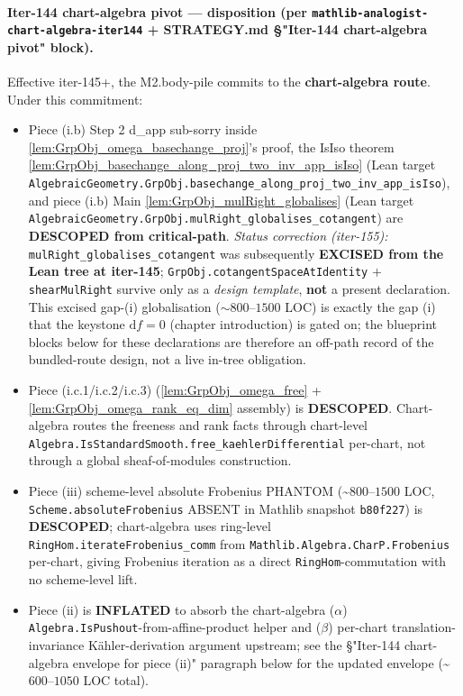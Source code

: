\paragraph{Iter-144 chart-algebra pivot --- disposition (per \texttt{mathlib-analogist-chart-algebra-iter144} + STRATEGY.md \S "Iter-144 chart-algebra pivot" block).}
Effective iter-145+, the M2.body-pile commits to the \textbf{chart-algebra route}. Under this commitment:
\begin{itemize}
  \item Piece (i.b) Step 2 d\_app sub-sorry inside \cref{lem:GrpObj_omega_basechange_proj}'s proof, the IsIso theorem \cref{lem:GrpObj_basechange_along_proj_two_inv_app_isIso} (Lean target \texttt{AlgebraicGeometry.GrpObj.basechange\_along\_proj\_two\_inv\_app\_isIso}), and piece (i.b) Main \cref{lem:GrpObj_mulRight_globalises} (Lean target \texttt{AlgebraicGeometry.GrpObj.mulRight\_globalises\_cotangent}) are \textbf{DESCOPED from critical-path}. \emph{Status correction (iter-155):} \texttt{mulRight\_globalises\_cotangent} was subsequently \textbf{EXCISED from the Lean tree at iter-145}; \texttt{GrpObj.cotangentSpaceAtIdentity} \(+\) \texttt{shearMulRight} survive only as a \emph{design template}, \textbf{not} a present declaration. This excised gap-(i) globalisation (\(\sim 800\)--\(1500\) LOC) is exactly the gap (i) that the keystone \(\mathrm df = 0\) (chapter introduction) is gated on; the blueprint blocks below for these declarations are therefore an off-path record of the bundled-route design, not a live in-tree obligation.
  \item Piece (i.c.1/i.c.2/i.c.3) (\cref{lem:GrpObj_omega_free} + \cref{lem:GrpObj_omega_rank_eq_dim} assembly) is \textbf{DESCOPED}. Chart-algebra routes the freeness and rank facts through chart-level \texttt{Algebra.IsStandardSmooth.free\_kaehlerDifferential} per-chart, not through a global sheaf-of-modules construction.
  \item Piece (iii) scheme-level absolute Frobenius PHANTOM (\textasciitilde\(800\)--\(1500\) LOC, \texttt{Scheme.absoluteFrobenius} ABSENT in Mathlib snapshot \texttt{b80f227}) is \textbf{DESCOPED}; chart-algebra uses ring-level \texttt{RingHom.iterateFrobenius\_comm} from \texttt{Mathlib.Algebra.CharP.Frobenius} per-chart, giving Frobenius iteration as a direct \texttt{RingHom}-commutation with no scheme-level lift.
  \item Piece (ii) is \textbf{INFLATED} to absorb the chart-algebra (\(\alpha\)) \texttt{Algebra.IsPushout}-from-affine-product helper and (\(\beta\)) per-chart translation-invariance Kähler-derivation argument upstream; see the \S "Iter-144 chart-algebra envelope for piece (ii)" paragraph below for the updated envelope (\textasciitilde\(600\)--\(1050\) LOC total).
\end{itemize}

